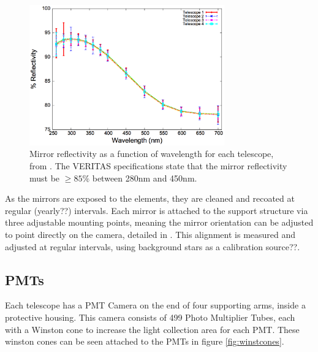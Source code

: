 \begin{figure}[h]
  \begin{center}
    \includegraphics[width=0.75\textwidth]{images/mirror_reflect}
    \caption[Mirror Reflectivity]{Mirror reflectivity as a function of wavelength for each telescope, from \cite{mirrorfacets}.  The VERITAS specifications state that the mirror reflectivity must be $\geq 85\%$ between 280nm and 450nm.}\label{fig:mirreflect}
  \end{center}
\end{figure}

As the mirrors are exposed to the elements, they are cleaned and recoated at regular (yearly??) intervals.
Each mirror is attached to the support structure via three adjustable mounting points, meaning the mirror orientation can be adjusted to point directly on the camera, detailed in \cite{mirroralign}.
This alignment is measured and adjusted at regular intervals, using background stars as a calibration source??.

\subsection{PMTs}

Each telescope has a PMT Camera on the end of four supporting arms, inside a protective housing.
This camera consists of 499 Photo Multiplier Tubes, each with a Winston cone to increase the light collection area for each PMT.
These winston cones can be seen attached to the PMTs in figure \ref{fig:winstcones}.

